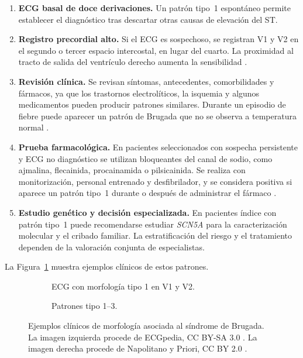 \begin{enumerate}
  \item \textbf{ECG basal de doce derivaciones.} Un patrón tipo~1 espontáneo permite establecer el diagnóstico tras descartar otras causas de elevación del ST.
  \item \textbf{Registro precordial alto.} Si el ECG es sospechoso, se registran V1 y V2 en el segundo o tercer espacio intercostal, en lugar del cuarto. La proximidad al tracto de salida del ventrículo derecho aumenta la sensibilidad \cite{zeppenfeld2022}.
  \item \textbf{Revisión clínica.} Se revisan síntomas, antecedentes, comorbilidades y fármacos, ya que los trastornos electrolíticos, la isquemia y algunos medicamentos pueden producir patrones similares. Durante un episodio de fiebre puede aparecer un patrón de Brugada que no se observa a temperatura normal \cite{zeppenfeld2022}.
  \item \textbf{Prueba farmacológica.} En pacientes seleccionados con sospecha persistente y ECG no diagnóstico se utilizan bloqueantes del canal de sodio, como ajmalina, flecainida, procainamida o pilsicainida. Se realiza con monitorización, personal entrenado y desfibrilador, y se considera positiva si aparece un patrón tipo~1 durante o después de administrar el fármaco \cite{wilde2023scbt}.
  \item \textbf{Estudio genético y decisión especializada.} En pacientes índice con patrón tipo~1 puede recomendarse estudiar \emph{SCN5A} para la caracterización molecular y el cribado familiar. La estratificación del riesgo y el tratamiento dependen de la valoración conjunta de especialistas.
\end{enumerate}

La Figura~\ref{fig:brugada_clinical_examples} muestra ejemplos clínicos de estos patrones.

\begin{figure}[H]
  \centering
  \begin{subfigure}[t]{0.58\textwidth}
    \centering
    \caption{ECG con morfología tipo 1 en V1 y V2.}
  \end{subfigure}
  \hfill
  \begin{subfigure}[t]{0.34\textwidth}
    \centering
    \caption{Patrones tipo 1--3.}
  \end{subfigure}
  \caption{Ejemplos clínicos de morfología asociada al síndrome de Brugada. La imagen izquierda procede de ECGpedia, CC BY-SA 3.0 \cite{ecgpediaType1Image}. La imagen derecha procede de Napolitano y Priori, CC BY 2.0 \cite{napolitano2006}.}
  \label{fig:brugada_clinical_examples}
\end{figure}

